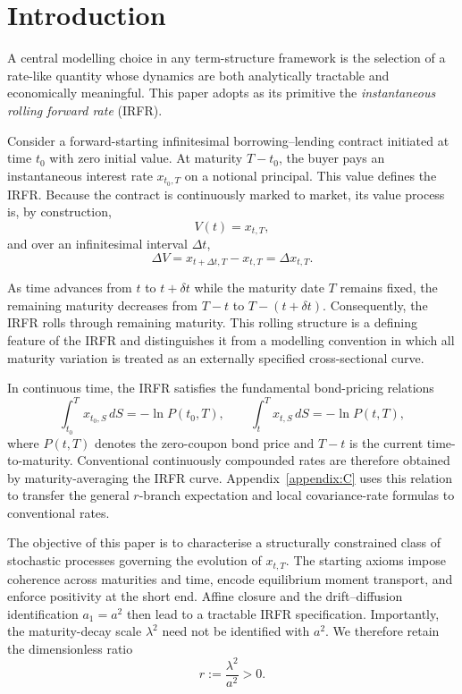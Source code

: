 \documentclass[12pt]{article}
\theoremstyle{statementstyle}
\begin{document}
\section{Introduction}
\label{sec:introduction}

A central modelling choice in any term-structure framework is the
selection of a rate-like quantity whose dynamics are both analytically
tractable and economically meaningful. This paper adopts as its
primitive the \emph{instantaneous rolling forward rate} (IRFR).

Consider a forward-starting infinitesimal borrowing--lending contract
initiated at time $t_{0}$ with zero initial value. At maturity
$T-t_{0}$, the buyer pays an instantaneous interest rate
$x_{t_{0},T}$ on a notional principal. This value defines the IRFR.
Because the contract is continuously marked to market, its value
process is, by construction,
\[
V(t)=x_{t,T},
\]
and over an infinitesimal interval $\Delta t$,
\[
\Delta V=x_{t+\Delta t,T}-x_{t,T}=\Delta x_{t,T}.
\]

As time advances from $t$ to $t+\delta t$ while the maturity date $T$
remains fixed, the remaining maturity decreases from $T-t$ to
$T-(t+\delta t)$. Consequently, the IRFR rolls through remaining
maturity. This rolling structure is a defining feature of the IRFR and
distinguishes it from a modelling convention in which all maturity
variation is treated as an externally specified cross-sectional curve.

In continuous time, the IRFR satisfies the fundamental bond-pricing
relations
\[
\int_{t_{0}}^{T}x_{t_{0},S}\,dS=-\ln P(t_{0},T),
\qquad
\int_{t}^{T}x_{t,S}\,dS=-\ln P(t,T),
\]
where $P(t,T)$ denotes the zero-coupon bond price and $T-t$ is the
current time-to-maturity. Conventional continuously compounded rates are
therefore obtained by maturity-averaging the IRFR curve. Appendix~\ref{appendix:C}
uses this relation to transfer the general $r$-branch expectation and
local covariance-rate formulas to conventional rates.

The objective of this paper is to characterise a structurally constrained
class of stochastic processes governing the evolution of $x_{t,T}$. The
starting axioms impose coherence across maturities and time, encode
equilibrium moment transport, and enforce positivity at the short end.
Affine closure and the drift--diffusion identification $a_{1}=a^{2}$ then
lead to a tractable IRFR specification. Importantly, the maturity-decay
scale $\lambda^{2}$ need not be identified with $a^{2}$. We therefore
retain the dimensionless ratio
\[
r:=\frac{\lambda^{2}}{a^{2}}>0.
\]
\end{document}
